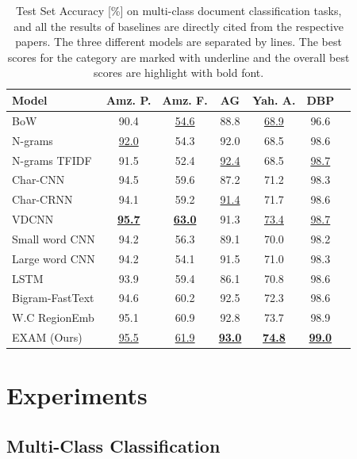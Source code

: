 \documentclass[letterpaper]{article} %
\begin{document}
 \begin{table}
  \caption{Test Set Accuracy [\%] on multi-class document classification tasks, and all the results of baselines are directly cited from the respective papers. The three different models are separated by lines. The best scores for the category are marked with underline and the overall best scores are highlight with bold font.}
  \label{multi-class}
  \centering
  \begin{tabular}{lcccccc}
    \toprule
    Model   &Amz. P. & Amz. F. &AG    &Yah. A. & DBP \\
    \midrule
    BoW \cite{charcnn}  & 90.4&\underline{54.6}  &88.8  &\underline{68.9} &96.6    \\
    N-grams \cite{charcnn}  &\underline{92.0} &54.3 &92.0  &68.5 &98.6    \\
    N-grams TFIDF \cite{charcnn} &91.5 & 52.4 &\underline{92.4}  &68.5 &\underline{98.7}  \\
    \midrule
    Char-CNN \cite{charcnn}  &94.5 & 59.6 &87.2  &71.2 &98.3    \\
    Char-CRNN \cite{charcnn}  &94.1 & 59.2 &\underline{91.4}  &71.7 &98.6      \\    
    VDCNN \cite{vdcnn} &\underline{\textbf{95.7}} & \underline{\textbf{63.0}} &91.3  &\underline{73.4} &\underline{98.7}    \\
    \midrule
    Small word CNN \cite{charcnn}  &94.2 & 56.3 &89.1 &70.0 &98.2      \\
    Large word CNN \cite{charcnn}  &94.2 & 54.1 &91.5  &71.0 &98.3      \\
    LSTM \cite{charcnn} &93.9 &59.4 &86.1 &70.8 &98.6\\
    Bigram-FastText \cite{fasttext} &94.6 &60.2 &92.5 &72.3 &98.6\\
    W.C RegionEmb \cite{regionemb} &95.1 &60.9 &92.8 &73.7 &98.9 \\
    EXAM (Ours)  &\underline{95.5} &\underline{61.9} & \underline{\textbf{93.0}}& \underline{\textbf{74.8}}& \underline{\textbf{99.0}}\\
    \bottomrule
  \end{tabular}
\end{table}

\section{Experiments}
\subsection{Multi-Class Classification}
\end{document}
